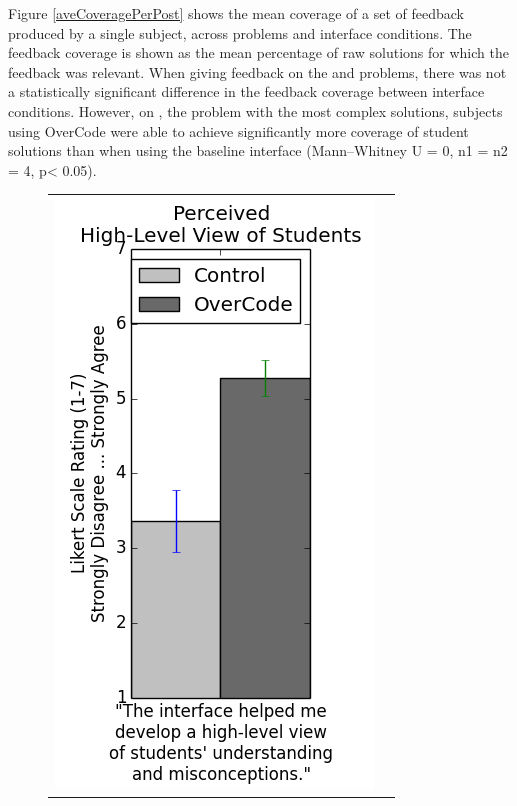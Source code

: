 Figure \ref{aveCoveragePerPost} shows the mean coverage of a set of feedback produced by a single subject, across problems and interface conditions. The feedback coverage is shown as the mean percentage of raw solutions for which the feedback was relevant. When giving feedback on the  and  problems, there was not a statistically significant difference in the feedback coverage between interface conditions. However, on , the problem with the most complex solutions, subjects using OverCode were able to achieve significantly more coverage of student solutions than when using the baseline interface (Mann--Whitney U = 0, n1 = n2 = 4, p< 0.05).

\begin{figure}[t!]
\begin{tabular}{c | c}
\begin{minipage}{.5\linewidth}
\centering
\includegraphics[scale=0.5]{Body/figures/overcode/highLevelViewStudy2.png}
\end{minipage}
&
\begin{minipage}{.5\linewidth}
\centering

\end{minipage}
\end{tabular}
\end{figure}
